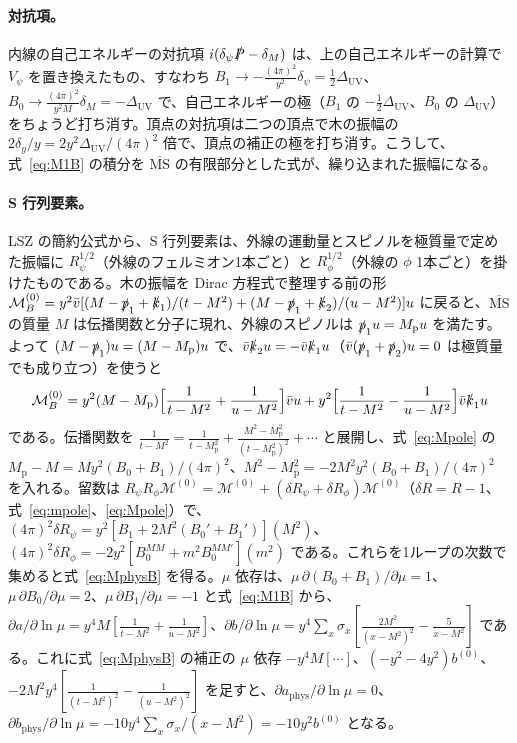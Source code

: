 \documentclass[a4paper,10pt]{ltjsarticle}
\newcommand{\MSbar}{\overline{\mathrm{MS}}}
\begin{document}
\paragraph{対抗項。}内線の自己エネルギーの対抗項 $i(\delta_\psi\slashed P-\delta_M)$ は、上の自己エネルギーの計算で $V_\psi$ を置き換えたもの、すなわち $B_1\to-\frac{(4\pi)^2}{y^2}\delta_\psi=\frac12\Delta_{\mathrm{UV}}$、$B_0\to\frac{(4\pi)^2}{y^2M}\delta_M=-\Delta_{\mathrm{UV}}$ で、自己エネルギーの極（$B_1$ の $-\frac12\Delta_{\mathrm{UV}}$、$B_0$ の $\Delta_{\mathrm{UV}}$）をちょうど打ち消す。頂点の対抗項は二つの頂点で木の振幅の $2\delta_y/y=2y^2\Delta_{\mathrm{UV}}/(4\pi)^2$ 倍で、頂点の補正の極を打ち消す。こうして、式~\eqref{eq:M1B} の積分を $\MSbar$ の有限部分とした式が、繰り込まれた振幅になる。

\paragraph{S 行列要素。}LSZ の簡約公式から、S 行列要素は、外線の運動量とスピノルを極質量で定めた振幅に $R_\psi^{1/2}$（外線のフェルミオン1本ごと）と $R_\phi^{1/2}$（外線の $\phi$ 1本ごと）を掛けたものである。木の振幅を Dirac 方程式で整理する前の形 $\mathcal M_B^{(0)}=y^2\bar v[(M-\slashed p_1+\slashed k_1)/(t-M^2)+(M-\slashed p_1+\slashed k_2)/(u-M^2)]u$ に戻ると、$\overline{\mathrm{MS}}$ の質量 $M$ は伝播関数と分子に現れ、外線のスピノルは $\slashed p_1u=M_{\mathrm p}u$ を満たす。よって $(M-\slashed p_1)u=(M-M_{\mathrm p})u$ で、$\bar v\slashed k_2u=-\bar v\slashed k_1u$（$\bar v(\slashed p_1+\slashed p_2)u=0$ は極質量でも成り立つ）を使うと
\begin{equation*}
\mathcal M_B^{(0)}=y^2(M-M_{\mathrm p})\Bigl[\frac{1}{t-M^2}+\frac{1}{u-M^2}\Bigr]\bar vu+y^2\Bigl[\frac{1}{t-M^2}-\frac{1}{u-M^2}\Bigr]\bar v\slashed k_1u
\end{equation*}
である。伝播関数を $\frac{1}{t-M^2}=\frac{1}{t-M_{\mathrm p}^2}+\frac{M^2-M_{\mathrm p}^2}{(t-M_{\mathrm p}^2)^2}+\cdots$ と展開し、式~\eqref{eq:Mpole} の $M_{\mathrm p}-M=My^2(B_0+B_1)/(4\pi)^2$、$M^2-M_{\mathrm p}^2=-2M^2y^2(B_0+B_1)/(4\pi)^2$ を入れる。留数は $R_\psi R_\phi\mathcal M^{(0)}=\mathcal M^{(0)}+(\delta R_\psi+\delta R_\phi)\mathcal M^{(0)}$（$\delta R=R-1$、式~\eqref{eq:mpole}、\eqref{eq:Mpole}）で、$(4\pi)^2\delta R_\psi=y^2[B_1+2M^2(B_0'+B_1')](M^2)$、$(4\pi)^2\delta R_\phi=-2y^2[B_0^{MM}+m^2B_0^{MM\prime}](m^2)$ である。これらを1ループの次数で集めると式~\eqref{eq:MphysB} を得る。$\mu$ 依存は、$\mu\,\partial(B_0+B_1)/\partial\mu=1$、$\mu\,\partial B_0/\partial\mu=2$、$\mu\,\partial B_1/\partial\mu=-1$ と式~\eqref{eq:M1B} から、$\partial a/\partial\ln\mu=y^4M[\frac{1}{t-M^2}+\frac{1}{u-M^2}]$、$\partial b/\partial\ln\mu=y^4\sum_x\sigma_x[\frac{2M^2}{(x-M^2)^2}-\frac{5}{x-M^2}]$ である。これに式~\eqref{eq:MphysB} の補正の $\mu$ 依存 $-y^4M[\cdots]$、$(-y^2-4y^2)b^{(0)}$、$-2M^2y^4[\frac{1}{(t-M^2)^2}-\frac{1}{(u-M^2)^2}]$ を足すと、$\partial a_{\mathrm{phys}}/\partial\ln\mu=0$、$\partial b_{\mathrm{phys}}/\partial\ln\mu=-10y^4\sum_x\sigma_x/(x-M^2)=-10y^2b^{(0)}$ となる。
\end{document}
